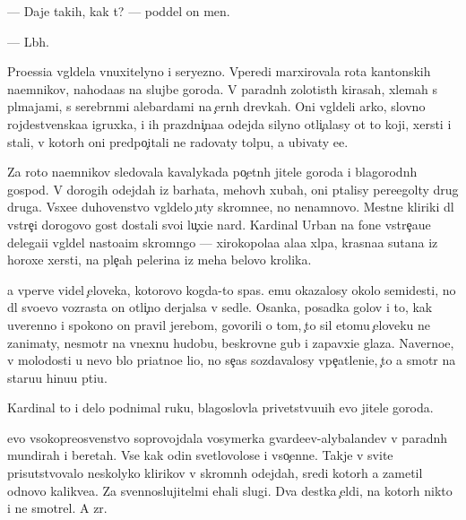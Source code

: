 \documentclass[10pt]{book}
\begin{document}
— Daje takih, kak t{\yi}? — poddel on men{\ia}.

— L{\iu}b{\yi}h.

Pro{\q}essi{\y}a v{\yi}gl{\ia}dela vnuxitelyno i seryezno. Vperedi marxirovala rota kantonskih na{\y}emnikov, nahod{\ia}{\x}a{\y}as{\ia} na slujbe goroda. V paradn{\yi}h zolotist{\yi}h kirasah, xlemah s pl{\iu}majami, s serebr{\ia}n{\yi}mi alebardami na {\c}ern{\yi}h drevkah. Oni v{\yi}gl{\ia}deli {\y}arko, slovno rojdestvenska{\y}a igruxka, i ih prazdni{\c}na{\y}a odejda silyno otli{\c}alasy ot to{\y} koji, xersti i stali, v kotor{\yi}h oni predpo{\c}itali ne radovaty tolpu, a ubivaty {\y}e{\y}e.

Za roto{\y} na{\y}emnikov sledovala kavalykada po{\c}etn{\yi}h jitele{\y} goroda i blagorodn{\yi}h gospod. V dorogih odejdah iz barhata, mehov{\yi}h xubah, oni p{\yi}talisy pere{\x}egol{\ia}ty drug druga. V{\yi}sxe{\y}e duhovenstvo v{\yi}gl{\ia}delo {\c}uty skromne{\y}e, no nenamnovo. Mestn{\yi}{\y}e kliriki dl{\ia} vstre{\c}i dorogovo gost{\ia} dostali svo{\y}i lu{\c}xi{\y}e nar{\ia}d{\yi}. Kardinal Urban na fone vstre{\c}a{\y}u{\x}e{\y} delega{\q}i{\y}i v{\yi}gl{\ia}del nasto{\y}a{\x}im skromn{\ia}go{\y} — xirokopola{\y}a ala{\y}a xl{\ia}pa, krasna{\y}a sutana iz horoxe{\y} xersti, na ple{\c}ah pelerina iz meha belovo krolika.

{\Y}a vperv{\yi}{\y}e videl {\c}eloveka, kotorovo kogda-to spas. {\Y}emu okazalosy okolo semides{\ia}ti, no dl{\ia} svo{\y}evo vozrasta on otli{\c}no derjalsa v sedle. Osanka, posadka golov{\yi} i to, kak uverenno i spoko{\y}no on pravil jereb{\q}om, govorili o tom, {\c}to sil etomu {\c}eloveku ne zanimaty, nesmotr{\ia} na vnexn{\iu}{\y}u hudobu, beskrovn{\yi}{\y}e gub{\yi} i zapavxi{\y}e glaza. Naverno{\y}e, v molodosti u nevo b{\yi}lo pri{\y}atno{\y}e li{\q}o, no se{\y}{\c}as sozdavalosy vpe{\c}atleni{\y}e, {\c}to {\y}a smotr{\iu} na staru{\y}u hi{\x}nu{\y}u pti{\q}u.

Kardinal to i delo podnimal ruku, blagoslovl{\ia}{\y}a privetstvu{\y}u{\x}ih {\y}evo jitele{\y} goroda.

{\Y}evo v{\yi}sokopreosv{\ia}{\x}enstvo soprovojdala vosymerka gvarde{\y}{\q}ev-alybaland{\q}ev v paradn{\yi}h mundirah i beretah. Vse kak odin svetlovolos{\yi}{\y}e i v{\yi}so{\c}enn{\yi}{\y}e. Takje v svite prisutstvovalo neskolyko klirikov v skromn{\yi}h odejdah, sredi kotor{\yi}h {\y}a zametil odnovo kalikve{\q}a. Za sv{\ia}{\x}ennoslujitel{\ia}mi {\y}ehali slugi. Dva des{\ia}tka {\c}el{\ia}di, na kotor{\yi}h nikto i ne smotrel. A zr{\ia}.
\end{document}
